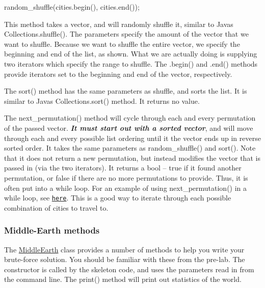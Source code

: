 \begin{DoxyCode}
random\_shuffle(cities.begin(), cities.end());
\end{DoxyCode}


This method takes a vector, and will randomly shuffle it, similar to Java\textquotesingle{}s {\ttfamily Collections.\+shuffle()}. The parameters specify the amount of the vector that we want to shuffle. Because we want to shuffle the entire vector, we specify the beginning and end of the list, as shown. What we are actually doing is supplying two iterators which specify the range to shuffle. The {\ttfamily .begin()} and {\ttfamily .end()} methods provide iterators set to the beginning and end of the vector, respectively.

The {\ttfamily sort()} method has the same parameters as shuffle, and sorts the list. It is similar to Java\textquotesingle{}s {\ttfamily Collections.\+sort()} method. It returns no value.

The {\ttfamily next\+\_\+permutation()} method will cycle through each and every permutation of the passed vector. {\itshape {\bfseries It must start out with a sorted vector}}, and will move through each and every possible list ordering until it the vector ends up in reverse sorted order. It takes the same parameters as {\ttfamily random\+\_\+shuffle()} and {\ttfamily sort()}. Note that it does not return a new permutation, but instead modifies the vector that is passed in (via the two iterators). It returns a bool -- {\ttfamily true} if it found another permutation, or {\ttfamily false} if there are no more permutations to provide. Thus, it is often put into a {\ttfamily while} loop. For an example of using {\ttfamily next\+\_\+permutation()} in a while loop, see \href{http://www.cplusplus.com/reference/algorithm/next_permutation/}{\tt here}. This is a good way to iterate through each possible combination of cities to travel to.

\subsubsection*{Middle-\/\+Earth methods}

The \hyperlink{class_middle_earth}{Middle\+Earth} class provides a number of methods to help you write your brute-\/force solution. You should be familiar with these from the pre-\/lab. The constructor is called by the skeleton code, and uses the parameters read in from the command line. The {\ttfamily print()} method will print out statistics of the world.

